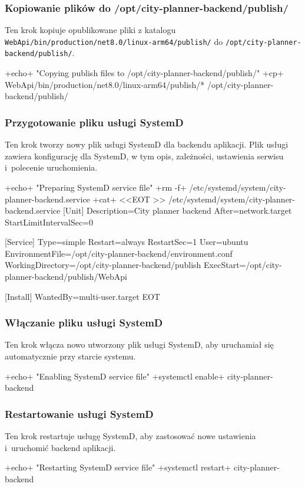 \subsubsection{Kopiowanie plików do /opt/city-planner-backend/publish/}
Ten krok kopiuje opublikowane pliki z katalogu \texttt{WebApi/bin/production/net8.0/linux-arm64/publish/} do \texttt{/opt/city-planner-backend/publish/}.
\begin{longlisting}[style=shell-colored,label={lst:db2}]
+echo+ "Copying publish files to /opt/city-planner-backend/publish/"
+cp+ WebApi/bin/production/net8.0/linux-arm64/publish/* /opt/city-planner-backend/publish/
\end{longlisting}

\subsubsection{Przygotowanie pliku usługi SystemD}
Ten krok tworzy nowy plik usługi SystemD dla backendu aplikacji.
Plik usługi zawiera konfigurację dla SystemD, w tym opis, zależności, ustawienia serwisu i~polecenie uruchomienia.

\begin{longlisting}[style=shell-colored,label={lst:db3}]
+echo+ "Preparing SystemD service file"
+rm -f+ /etc/systemd/system/city-planner-backend.service
+cat+ <<EOT >> /etc/systemd/system/city-planner-backend.service
[Unit]
Description=City planner backend
After=network.target
StartLimitIntervalSec=0

[Service]
Type=simple
Restart=always
RestartSec=1
User=ubuntu
EnvironmentFile=/opt/city-planner-backend/environment.conf
WorkingDirectory=/opt/city-planner-backend/publish
ExecStart=/opt/city-planner-backend/publish/WebApi

[Install]
WantedBy=multi-user.target
EOT
\end{longlisting}

\subsubsection{Włączanie pliku usługi SystemD}
Ten krok włącza nowo utworzony plik usługi SystemD, aby uruchamiał się automatycznie przy starcie systemu.
\begin{longlisting}[style=shell-colored,label={lst:db4}]
+echo+ "Enabling SystemD service file"
+systemctl enable+ city-planner-backend
\end{longlisting}

\subsubsection{Restartowanie usługi SystemD}
Ten krok restartuje usługę SystemD, aby zastosować nowe ustawienia i~uruchomić backend aplikacji.
\begin{longlisting}[style=shell-colored,label={lst:db5}]
+echo+ "Restarting SystemD service file"
+systemctl restart+ city-planner-backend
\end{longlisting}

